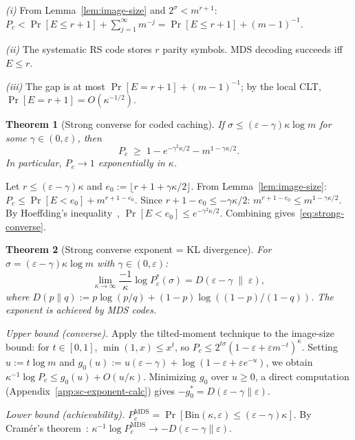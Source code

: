 \documentclass[journal]{IEEEtran}
\makeatletter
\newtheorem{theorem}{Theorem}[section]
\numberwithin{equation}{section}
\renewenvironment{proof}[1][\proofname]{\par
  \pushQED{\qed}%
  \normalfont \topsep6\p@\@plus6\p@\relax
  \trivlist
  \item[\hskip\labelsep
        \itshape
    #1\@addpunct{.}]\ignorespaces
}{%
  \popQED\endtrivlist\@endpefalse
}
\makeatother
\begin{document}
\begin{proof}
\emph{(i)}\;
From Lemma~\ref{lem:image-size} and
$2^\sigma<m^{r+1}$:
$P_c<\Pr[E\le r{+}1]
 +\sum_{j=1}^{\infty}m^{-j}
=\Pr[E\le r{+}1]+(m{-}1)^{-1}$.

\emph{(ii)}\;
The systematic RS code stores $r$ parity symbols.
MDS decoding succeeds iff $E\le r$.

\emph{(iii)}\;
The gap is at most $\Pr[E{=}r{+}1]+(m{-}1)^{-1}$;
by the local CLT, $\Pr[E{=}r{+}1]=O(\kappa^{-1/2})$.
\end{proof}

\begin{theorem}[Strong converse for coded caching]
\label{thm:strong-converse}
If $\sigma\le(\varepsilon{-}\gamma)\kappa\log m$ for some
$\gamma\in(0,\varepsilon)$, then
\begin{equation}\label{eq:strong-converse}
  P_e
  \;\ge\;
  1-e^{-\gamma^2\kappa/2}-m^{1-\gamma\kappa/2}.
\end{equation}
In particular, $P_e\to 1$ exponentially in $\kappa$.
\end{theorem}

\begin{proof}
Let $r\le(\varepsilon{-}\gamma)\kappa$ and
$e_0:=\lfloor r{+}1{+}\gamma\kappa/2\rfloor$.
From Lemma~\ref{lem:image-size}:
$P_c\le\Pr[E<e_0]+m^{r+1-e_0}$.
Since $r{+}1{-}e_0\le-\gamma\kappa/2$:
$m^{r+1-e_0}\le m^{1-\gamma\kappa/2}$.
By Hoeffding's inequality~\cite{hoeffding1963probability},
$\Pr[E<e_0]\le e^{-\gamma^2\kappa/2}$.
Combining gives~\eqref{eq:strong-converse}.
\end{proof}

\begin{theorem}[Strong converse exponent = KL divergence]
\label{thm:sc-exponent}
For $\sigma=(\varepsilon{-}\gamma)\kappa\log m$ with
$\gamma\in(0,\varepsilon)$:
\begin{equation}\label{eq:sc-exponent}
  \lim_{\kappa\to\infty}
  \frac{-1}{\kappa}\log P_c^*(\sigma)
  =D(\varepsilon{-}\gamma\;\|\;\varepsilon),
\end{equation}
where $D(p\|q):=p\log(p/q)+(1{-}p)\log((1{-}p)/(1{-}q))$.
The exponent is achieved by MDS codes.
\end{theorem}

\begin{proof}
\emph{Upper bound (converse).}\;
Apply the tilted-moment technique to the image-size bound:
for $t\in[0,1]$, $\min(1,x)\le x^t$, so
$P_c\le 2^{t\sigma}
  (1{-}\varepsilon{+}\varepsilon m^{-t})^\kappa$.
Setting $u:=t\log m$ and
$g_0(u):=u(\varepsilon{-}\gamma)
+\log(1{-}\varepsilon{+}\varepsilon e^{-u})$,
we obtain $\kappa^{-1}\log P_c\le g_0(u)+O(u/\kappa)$.
Minimizing $g_0$ over $u\ge 0$, a direct computation
(Appendix~\ref{app:sc-exponent-calc}) gives
$-g_0^*=D(\varepsilon{-}\gamma\|\varepsilon)$.

\emph{Lower bound (achievability).}\;
$P_c^{\mathrm{MDS}}
=\Pr[\mathrm{Bin}(\kappa,\varepsilon)
  \le(\varepsilon{-}\gamma)\kappa]$.
By Cram\'{e}r's theorem~\cite[Theorem~2.2.3]{dembo2009large}:
$\kappa^{-1}\log P_c^{\mathrm{MDS}}
\to -D(\varepsilon{-}\gamma\|\varepsilon)$.
\end{proof}
\end{document}
